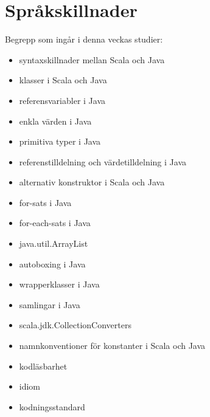 \chapter{Språkskillnader}\label{chapter:W11}
Begrepp som ingår i denna veckas studier:
\begin{itemize}[noitemsep,label={$\square$},leftmargin=*]
\item syntaxskillnader mellan Scala och Java
\item klasser i Scala och Java
\item referensvariabler i Java
\item enkla värden i Java
\item primitiva typer i Java
\item referenstilldelning och värdetilldelning i Java
\item alternativ konstruktor i Scala och Java
\item for-sats i Java
\item for-each-sats i Java
\item java.util.ArrayList
\item autoboxing i Java
\item wrapperklasser i Java
\item samlingar i Java
\item scala.jdk.CollectionConverters
\item namnkonventioner för konstanter i Scala och Java
\item kodläsbarhet
\item idiom
\item kodningsstandard\end{itemize}
